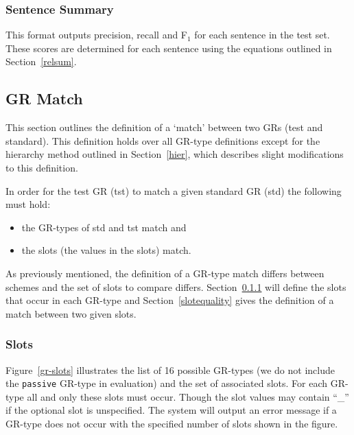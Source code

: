 \documentclass[10pt]{article}
\newcommand{\stt}[1]{{\small\texttt{#1}}}
\begin{document}
\subsubsection{Sentence Summary}
\label{sentsum}

This format outputs precision, recall and F$_{1}$
for each sentence in the test set. These scores are determined
for each sentence using the equations outlined in
Section~\ref{relsum}. 

\subsection{GR Match}

This section outlines the definition of a `match' between
two GRs (test and standard). This definition holds over all
GR-type definitions except for the hierarchy method
outlined in Section~\ref{hier}, which describes
slight modifications to this definition.

In order for the test GR (tst) to match a given standard GR (std)
the following must hold:
\begin{itemize}
\item the GR-types of std and tst match and
\item the slots (the values in the slots) match.
\end{itemize}
As previously mentioned, the definition of a GR-type match
differs between schemes and the set of slots to compare differs.
Section~\ref{slots} will define the slots that occur in each GR-type
and Section~\ref{slotequality} gives the definition of 
a match between two given slots.

\subsubsection{Slots}
\label{slots}

Figure~\ref{gr-slots} illustrates the list of 16 possible GR-types
(we do not include the \stt{passive} GR-type in evaluation)
and the set of associated slots. For each GR-type all and only these
slots must occur. Though the slot values may 
contain ``\_'' if the optional slot is unspecified. The system
will output an error message if a GR-type does not occur with
the specified number of slots shown in the figure.
\end{document}
